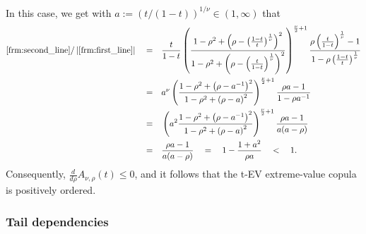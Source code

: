 \documentclass{article}
\def\abs#1{\left\lvert#1\right\rvert} %
\begin{document}
\begin{itemize}
    In this case, we get with $a:= (t/(1-t))^{1/\nu}\in(1,\infty)$ that
    \begin{align*}
        \eqref{frm:second_line}/\abs{\eqref{frm:first_line}}
        \quad = \quad & \frac{t}{1-t}\left(\frac{1 - \rho^2 + \left(\rho - \left(\frac{1-t}{t}\right)^{\frac{1}{\nu}}\right)^{2}}{1 - \rho^2 + \left(\rho - \left(\frac{t}{1-t}\right)^{\frac{1}{\nu}}\right)^{2}}\right)^{\frac{\nu}{2} + 1}\frac{\rho \left(\frac{t}{1 - t}\right)^{\frac{1}{\nu}}- 1}{1-\rho \left(\frac{1-t}{t}\right)^{\frac{1}{\nu}}} \allowdisplaybreaks\\
        = \quad & a^{\nu}\left(\frac{1 - \rho^2 + \left(\rho - a^{-1}\right)^{2}}{1 - \rho^2 + \left(\rho - a\right)^{2}}\right)^{\frac{\nu}{2} + 1}\frac{\rho a- 1}{1-\rho a^{-1}} \allowdisplaybreaks\\
        = \quad & \left(a^2\frac{1 - \rho^2 + \left(\rho - a^{-1}\right)^{2}}{1 - \rho^2 + \left(\rho - a\right)^{2}}\right)^{\frac{\nu}{2} + 1}\frac{\rho a- 1}{a(a-\rho)} \allowdisplaybreaks\\
        = \quad & \frac{\rho a- 1}{a(a-\rho)}
        \quad = \quad 1 - \frac{1+a^2}{\rho a}
        \quad < \quad 1
    .\end{align*}
    Consequently, $\frac{d}{d\rho} A_{\nu, \rho}(t) \leq 0$, and it follows that the t-EV extreme-value copula is positively ordered.
\end{itemize}

\subsubsection{Tail dependencies}
\label{subsubsec:extreme_value_tail_dependencies}
\end{document}
